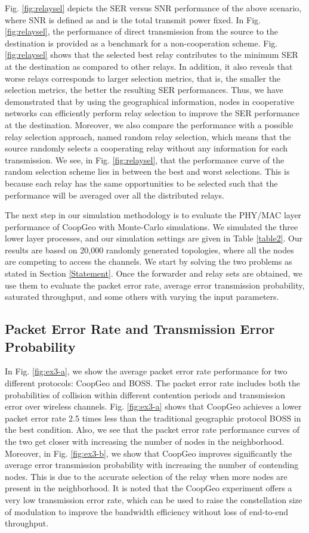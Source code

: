 \documentclass[journal,twoside,final]{IEEEtran}
\begin{document}
Fig. \ref{fig:relaysel} depicts the SER versus SNR performance of the above scenario, where SNR is defined as  and  is the total transmit power fixed. In Fig. \ref{fig:relaysel}, the performance of direct transmission from the source to the destination is provided as a benchmark for a non-cooperation scheme. Fig. \ref{fig:relaysel} shows that the selected best relay contributes to the minimum SER at the destination as compared to other relays. In addition, it also reveals that worse relays corresponds to larger selection metrics, that is, the smaller the selection metrics, the better the resulting SER performances. Thus, we have demonstrated that by using the geographical information, nodes in cooperative networks can efficiently perform relay selection to improve the SER performance at the destination. Moreover, we also compare the performance with a possible relay selection approach, named random relay selection, which means that the source randomly selects a cooperating relay without any information for each transmission. We see, in Fig. \ref{fig:relaysel}, that the performance curve of the random selection scheme lies in between the best and worst selections. This is because each relay has the same opportunities to be selected such that the performance will be averaged over all the distributed relays.


The next step in our simulation methodology is to evaluate the PHY/MAC layer performance of CoopGeo with Monte-Carlo simulations. We simulated the three lower layer processes, and our simulation settings are given in Table \ref{table2}. Our results are based on 20,000 randomly generated topologies, where all the nodes are competing to access the channels. We start by solving the two problems as stated in Section \ref{Statement}. Once the forwarder and relay sets are obtained, we use them to evaluate the packet error rate, average error transmission probability, saturated throughput, and some others with varying the input parameters.

\subsection{Packet Error Rate and Transmission Error Probability}
In Fig. \ref{fig:ex3-a}, we show the average packet error rate performance for two different protocols: CoopGeo and BOSS\cite{Sanchez2007}. The packet error rate includes both the probabilities of collision within different contention periods and transmission error over wireless channels. Fig. \ref{fig:ex3-a} shows that CoopGeo achieves a lower packet error rate 2.5 times less than the traditional geographic protocol BOSS in the best condition. Also, we see that the packet error rate performance curves of the two get closer with increasing the number of nodes in the neighborhood.
Moreover, in Fig. \ref{fig:ex3-b}, we show that CoopGeo improves significantly the average error transmission probability with increasing the number of contending nodes. This is due to the accurate selection of the relay when more nodes are present in the neighborhood. It is noted that the CoopGeo experiment offers a very low transmission error rate, which can be used to raise the constellation size of modulation to improve the bandwidth efficiency without loss of end-to-end throughput.
\end{document}
